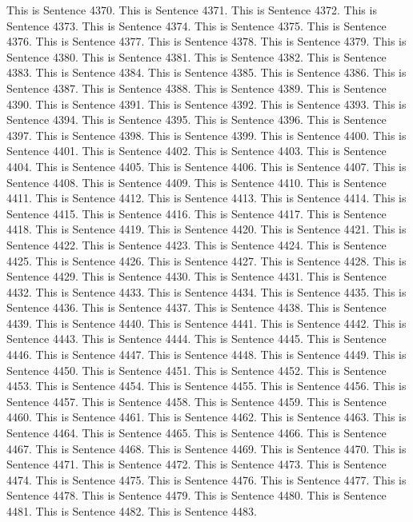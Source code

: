 \documentclass{article}
\begin{document}
This is Sentence 4370.
This is Sentence 4371.
This is Sentence 4372.
This is Sentence 4373.
This is Sentence 4374.
This is Sentence 4375.
This is Sentence 4376.
This is Sentence 4377.
This is Sentence 4378.
This is Sentence 4379.
This is Sentence 4380.
This is Sentence 4381.
This is Sentence 4382.
This is Sentence 4383.
This is Sentence 4384.
This is Sentence 4385.
This is Sentence 4386.
This is Sentence 4387.
This is Sentence 4388.
This is Sentence 4389.
This is Sentence 4390.
This is Sentence 4391.
This is Sentence 4392.
This is Sentence 4393.
This is Sentence 4394.
This is Sentence 4395.
This is Sentence 4396.
This is Sentence 4397.
This is Sentence 4398.
This is Sentence 4399.
This is Sentence 4400.
This is Sentence 4401.
This is Sentence 4402.
This is Sentence 4403.
This is Sentence 4404.
This is Sentence 4405.
This is Sentence 4406.
This is Sentence 4407.
This is Sentence 4408.
This is Sentence 4409.
This is Sentence 4410.
This is Sentence 4411.
This is Sentence 4412.
This is Sentence 4413.
This is Sentence 4414.
This is Sentence 4415.
This is Sentence 4416.
This is Sentence 4417.
This is Sentence 4418.
This is Sentence 4419.
This is Sentence 4420.
This is Sentence 4421.
This is Sentence 4422.
This is Sentence 4423.
This is Sentence 4424.
This is Sentence 4425.
This is Sentence 4426.
This is Sentence 4427.
This is Sentence 4428.
This is Sentence 4429.
This is Sentence 4430.
This is Sentence 4431.
This is Sentence 4432.
This is Sentence 4433.
This is Sentence 4434.
This is Sentence 4435.
This is Sentence 4436.
This is Sentence 4437.
This is Sentence 4438.
This is Sentence 4439.
This is Sentence 4440.
This is Sentence 4441.
This is Sentence 4442.
This is Sentence 4443.
This is Sentence 4444.
This is Sentence 4445.
This is Sentence 4446.
This is Sentence 4447.
This is Sentence 4448.
This is Sentence 4449.
This is Sentence 4450.
This is Sentence 4451.
This is Sentence 4452.
This is Sentence 4453.
This is Sentence 4454.
This is Sentence 4455.
This is Sentence 4456.
This is Sentence 4457.
This is Sentence 4458.
This is Sentence 4459.
This is Sentence 4460.
This is Sentence 4461.
This is Sentence 4462.
This is Sentence 4463.
This is Sentence 4464.
This is Sentence 4465.
This is Sentence 4466.
This is Sentence 4467.
This is Sentence 4468.
This is Sentence 4469.
This is Sentence 4470.
This is Sentence 4471.
This is Sentence 4472.
This is Sentence 4473.
This is Sentence 4474.
This is Sentence 4475.
This is Sentence 4476.
This is Sentence 4477.
This is Sentence 4478.
This is Sentence 4479.
This is Sentence 4480.
This is Sentence 4481.
This is Sentence 4482.
This is Sentence 4483.
\end{document}
